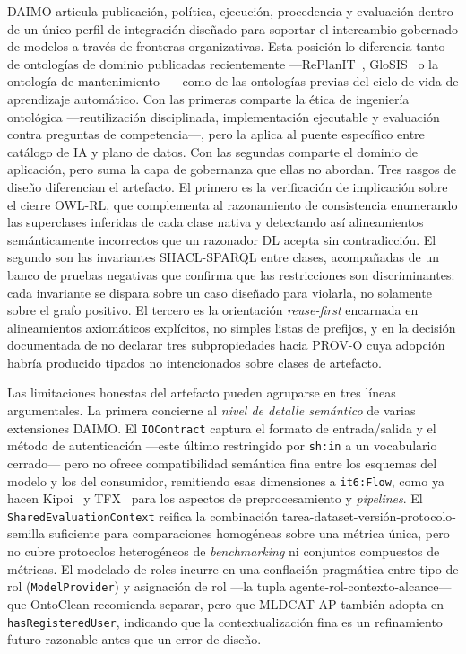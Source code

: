 \documentclass[11pt,a4paper]{article}
\newcommand{\code}[1]{\texttt{#1}}
\begin{document}
DAIMO articula publicación, política, ejecución, procedencia y evaluación dentro de un único perfil de integración diseñado para soportar el intercambio gobernado de modelos a través de fronteras organizativas. Esta posición lo diferencia tanto de ontologías de dominio publicadas recientemente ---RePlanIT~\cite{kurteva}, GloSIS~\cite{palma} o la ontología de mantenimiento~\cite{woods}--- como de las ontologías previas del ciclo de vida de aprendizaje automático. Con las primeras comparte la ética de ingeniería ontológica ---reutilización disciplinada, implementación ejecutable y evaluación contra preguntas de competencia---, pero la aplica al puente específico entre catálogo de IA y plano de datos. Con las segundas comparte el dominio de aplicación, pero suma la capa de gobernanza que ellas no abordan. Tres rasgos de diseño diferencian el artefacto. El primero es la verificación de implicación sobre el cierre OWL-RL, que complementa al razonamiento de consistencia enumerando las superclases inferidas de cada clase nativa y detectando así alineamientos semánticamente incorrectos que un razonador DL acepta sin contradicción. El segundo son las invariantes SHACL-SPARQL entre clases, acompañadas de un banco de pruebas negativas que confirma que las restricciones son discriminantes: cada invariante se dispara sobre un caso diseñado para violarla, no solamente sobre el grafo positivo. El tercero es la orientación \emph{reuse-first} encarnada en alineamientos axiomáticos explícitos, no simples listas de prefijos, y en la decisión documentada de no declarar tres subpropiedades hacia PROV-O cuya adopción habría producido tipados no intencionados sobre clases de artefacto.

Las limitaciones honestas del artefacto pueden agruparse en tres líneas argumentales. La primera concierne al \emph{nivel de detalle semántico} de varias extensiones DAIMO. El \code{IOContract} captura el formato de entrada/salida y el método de autenticación ---este último restringido por \code{sh:in} a un vocabulario cerrado--- pero no ofrece compatibilidad semántica fina entre los esquemas del modelo y los del consumidor, remitiendo esas dimensiones a \code{it6:Flow}, como ya hacen Kipoi~\cite{kipoi} y TFX~\cite{tfx} para los aspectos de preprocesamiento y \emph{pipelines}. El \code{SharedEvaluationContext} reifica la combinación tarea-dataset-versión-protocolo-semilla suficiente para comparaciones homogéneas sobre una métrica única, pero no cubre protocolos heterogéneos de \emph{benchmarking} ni conjuntos compuestos de métricas. El modelado de roles incurre en una conflación pragmática entre tipo de rol (\code{ModelProvider}) y asignación de rol ---la tupla agente-rol-contexto-alcance--- que OntoClean recomienda separar, pero que MLDCAT-AP también adopta en \code{hasRegisteredUser}, indicando que la contextualización fina es un refinamiento futuro razonable antes que un error de diseño.
\end{document}
